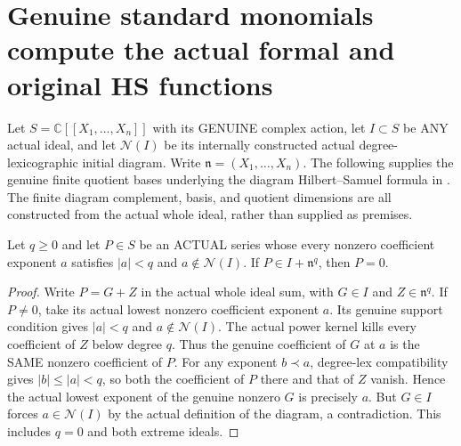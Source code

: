 \section{Genuine standard monomials compute the actual formal and original HS functions}

Let $S=\mathbb C[[X_1,\ldots,X_n]]$ with its GENUINE complex action,
let $I\subset S$ be ANY actual ideal, and let $\mathcal N(I)$ be its
internally constructed actual degree-lexicographic initial diagram.
Write $\mathfrak n=(X_1,\ldots,X_n)$. The following supplies the genuine
finite quotient bases underlying the diagram Hilbert--Samuel formula in
\cite[\S7, Lemmas~7.5--7.7, pp.~261--264]{bierstone-milman97-invent-math}.
The finite diagram complement, basis, and quotient dimensions are all
constructed from the actual whole ideal, rather than supplied as premises.

\begin{lemma}
\label{hir:actual-formal-standard-monomial-jet-separation}
Let $q\ge0$ and let $P\in S$ be an ACTUAL series whose every nonzero
coefficient exponent $a$ satisfies $|a|<q$ and $a\notin\mathcal N(I)$.
If $P\in I+\mathfrak n^q$, then $P=0$.
\leanok
\end{lemma}
\begin{proof}
Write $P=G+Z$ in the actual whole ideal sum, with $G\in I$ and
$Z\in\mathfrak n^q$. If $P\ne0$, take its actual lowest nonzero
coefficient exponent $a$. Its genuine support condition gives $|a|<q$
and $a\notin\mathcal N(I)$. The actual power kernel kills every
coefficient of $Z$ below degree $q$. Thus the genuine coefficient of
$G$ at $a$ is the SAME nonzero coefficient of $P$. For any exponent
$b\prec a$, degree-lex compatibility gives $|b|\le|a|<q$, so both
the coefficient of $P$ there and that of $Z$ vanish. Hence the actual
lowest exponent of the genuine nonzero $G$ is precisely $a$. But
$G\in I$ forces $a\in\mathcal N(I)$ by the actual definition of the
diagram, a contradiction. This includes $q=0$ and both extreme ideals.
\end{proof}

